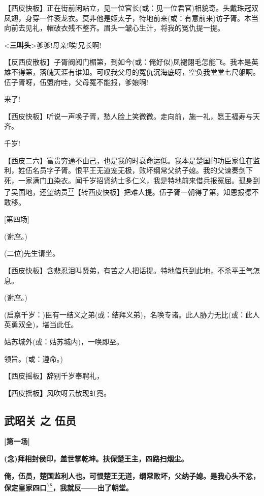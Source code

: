 【西皮快板】正在街前闲站立，见一位官长(或：见一位君官)相貌奇。头戴珠冠双凤翅，身穿一件衮龙衣。莫非他是姬太子，特地前来(或：有意前来)访子胥。本当向前去见礼，帽破衣残不整齐。眉头一皱心生计，将我的冤仇提一提。

\textless{}\textbf{三叫头}\textgreater{}爹爹!母亲!唉!兄长啊!

【反西皮散板】子胥阀阅门楣第，到如今(或：俺好似)凤褪翎毛怎能飞。我本是英雄不得第，落魄天涯有谁知。可叹我父母的冤仇沉海底呀，空负我堂堂七尺躯啊。伍子胥呀，伍盟府哇，父母冤不能报，爹娘啊!

来了!

【西皮快板】听说一声唤子胥，愁人脸上笑微微。走向前，施一礼，愿王福寿与天齐。

千岁!

【西皮二六】富贵穷通不由己，也是我的时衰命运低。我本是楚国的功臣家住在监利，姓伍名员字子胥。恨平王无道宠无极，败坏纲常父纳子媳。我的父谏奏剑下死，一家满门血染衣。闻千岁招贤纳士多仁义，我是特地前来借兵报冤屈。孤身到了吴国地，还望纳员\protect\hyperlink{fn77}{\textsuperscript{77}}【转西皮快板】把难人提。伍子胥一朝得了第，知恩报德不敢移。

{[}第四场{]}

(谢座。)

(二位)先生请坐。

【西皮快板】含悲忍泪叫贤弟，有苦之人把话提。特地借兵到此地，不杀平王气怎息。

(谢座。)

(启禀千岁：)臣有一结义之弟(或：结拜义弟)，名唤专诸。此人胁力无比(或：此人英勇双全)，堪当此任。

姑苏城外(或：姑苏城内)，一唤即至。

领旨。(或：遵命。)

【西皮摇板】辞别千岁奉聘礼，

\textbf{【}西皮摇板\textbf{】}风吹呀云散现虹霓。

\newpage
\hypertarget{ux6b66ux662dux5173-ux4e4b-ux4f0dux5458}{%
\subsection{武昭关 之
伍员}\label{ux6b66ux662dux5173-ux4e4b-ux4f0dux5458}}

\textbf{{[}第一场{]}}

\textbf{(念)拜相封侯印，盖世掌乾坤。扶保楚王主，四路扫烟尘。}

\textbf{俺，伍员，楚国监利人也。可恨楚王无道，纲常败坏，父纳子媳。是我心头不忿，保定皇家四口}\protect\hyperlink{fn78}{\textsuperscript{78}}\textbf{，我就反------出了朝堂。}

